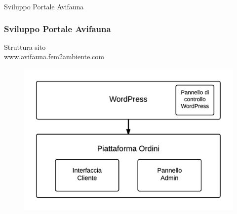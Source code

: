 \documentclass{beamer}
\def \sv {Sviluppo Portale Avifauna}
\begin{document}
\begin{frame}
 \begin{center}
  {\huge Sviluppo Portale Avifauna}
 \end{center}
\end{frame}

\begin{frame}
 \frametitle{\sv}
 \begin{center}
  Struttura sito \\www.avifauna.fem2ambiente.com \\
  \begin{figure}
    \includegraphics[scale=0.9]{images/struttura-sito}
  \end{figure}
 \end{center}
\end{frame}
\end{document}
